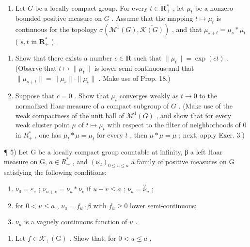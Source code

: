 \begin{enumerate}
\def\labelenumi{\arabic{enumi})}
\setcounter{enumi}{3}
\tightlist
\item
  Let \(G\) be a locally compact group. For every \(t \in \mathbf{R}_+^*\) , let \(\mu_t\) be a nonzero bounded positive measure on \(G\) . Assume that the mapping \(t \mapsto \mu_t\) is continuous for the topology \(\sigma(\mathcal{M}^1(G), \overline{\mathcal{K}(G)})\) , and that \(\mu_{s+t} = \mu_s * \mu_t\) ( \(s, t\) in \(\mathbf{R}_+^*\) ).
\end{enumerate}

\begin{enumerate}
\def\labelenumi{\alph{enumi})}
\item
  Show that there exists a number \(c \in \mathbf{R}\) such that \(\| \mu_t \| = \exp(ct)\) . (Observe that \(t \mapsto \| \mu_t \|\) is lower semi-continuous and that \(\| \mu_{s+t} \| = \| \mu_s \| \cdot \| \mu_t \|\) . Make use of Prop. 18.)
\item
  Suppose that \(c = 0\) . Show that \(\mu_t\) converges weakly as \(t \to 0\) to the normalized Haar measure of a compact subgroup of \(G\) . (Make use of the weak compactness of the unit ball of \(\mathcal{M}^1(G)\) , and show that for every weak cluster point \(\mu\) of \(t \mapsto \mu_t\) with respect to the filter of neighborhoods of 0 in \(R_+^*\) , one has \(\mu_t * \mu = \mu_t\) for every \(t\) , then \(\mu * \mu = \mu\) ; next, apply Exer. 3.)
\end{enumerate}

¶ 5) Let G be a locally compact group countable at infinity, β a left Haar measure on G, \(a \in R_{+}^{*}\) , and \((\nu_{u})_{0 \leqslant u \leqslant a}\) a family of positive measures on G satisfying the following conditions:

\begin{enumerate}
\def\labelenumi{(\roman{enumi})}
\item
  \(\nu_0 = \varepsilon_e\) ; \(\nu_{u + v} = \nu_u * \nu_v\) if \(u + v \leqslant a\) ; \(\nu_u = \stackrel{\vee}{\nu}_u\) ;
\item
  for \(0 < u \leqslant a\) , \(\nu_{u} = f_{u} \cdot \beta\) with \(f_{u} \geqslant 0\) lower semi-continuous;
\item
  \(\nu_{u}\) is a vaguely continuous function of \(u\) .
\end{enumerate}

\begin{enumerate}
\def\labelenumi{\alph{enumi})}
\tightlist
\item
  Let \(f \in \mathcal{K}_{+}(\mathrm{G})\) . Show that, for \(0 < u \leqslant a\) ,
\end{enumerate}

